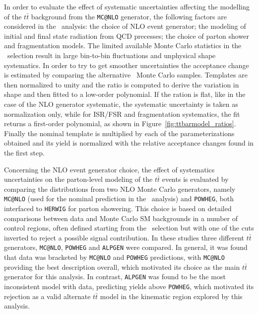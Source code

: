 In order to evaluate the effect of systematic uncertainties 
affecting the modelling of the $t\bar{t}$ background from the
\texttt{MC@NLO} generator, the following factors are considered
in the \wbx\ analysis: the choice of NLO event generator;
the modeling of initial and final state radiation from QCD
precesses; the choice of parton shower and fragmentation models.
The limited available Monte Carlo statistics in 
the \tight\ selection result in 
large bin-to-bin fluctuations and unphysical shape systematics.
In order to try to get smoother uncertainties 
the acceptance change is estimated by comparing 
the alternative \ttbar\ Monte Carlo samples.
Templates are then normalized to unity and the
ratio is computed to derive the variation in shape
and then fitted to a low-order polynomial.
If the ration is flat, like in the case of
the NLO generator systematic, the systematic uncertainty
is taken as normalization only, while 
for ISR/FSR and fragmentation systematics,
the fit returns a  first-order polynomial, as shown in Figure~\ref{fig:ttbarmodel_ratios}.
Finally the nominal template is multiplied by 
each of the parameterizations obtained and 
its yield is normalized with the relative 
acceptance changes found in the first step.


Concerning the NLO event generator choice, the effect of 
systematics uncertainties on the parton-level modeling of the
$t\bar{t}$ events is evaluated by comparing the distributions from two 
NLO Monte Carlo generators, namely \texttt{MC@NLO} (used for the nominal 
prediction in the \wbx\ 
analysis) and \texttt{POWHEG}, both interfaced to \texttt{HERWIG} for
parton showering.  This choice is based on detailed comparisons
between data and Monte Carlo SM backgrounds in a number 
of control regions, often defined starting from the \loose\ selection 
but with one of the cuts inverted to reject a possible signal contribution. 
In these studies three different $t\bar{t}$ generators, \texttt{MC@NLO}, \texttt{POWHEG} and
\texttt{ALPGEN} were compared. In general, it was found that 
data was bracketed by \texttt{MC@NLO} and \texttt{POWHEG} predictions,
with \texttt{MC@NLO} providing the best description overall, which 
motivated its choice as the main $t\bar{t}$ generator for this analysis. 
In contrast, \texttt{ALPGEN} was found to be the most inconsistent 
model with data, predicting yields above \texttt{POWHEG}, which 
motivated its rejection
as a valid alternate $t\bar{t}$  model in the kinematic region 
explored by this analysis.

